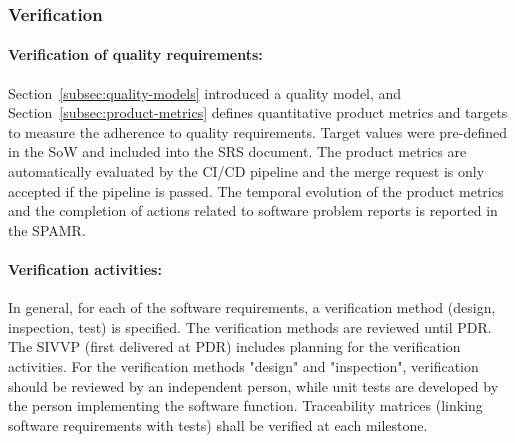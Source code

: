 \subsubsection{Verification}
\label{subsec:verification}

%
%
%
%
%
%

\paragraph*{Verification of quality requirements:} Section~\ref{subsec:quality-models} introduced a quality model, and Section~\ref{subsec:product-metrics} defines quantitative product metrics and targets to measure the adherence to quality requirements. Target values were pre-defined in the SoW and included into the SRS document. The product metrics are automatically evaluated by the CI/CD pipeline and the merge request is only accepted if the pipeline is passed. The temporal evolution of the product metrics and the completion of actions related to software problem reports is reported in the SPAMR.

\paragraph*{Verification activities:} In general, for each of the software requirements, a verification method (design, inspection, test) is specified. The verification methods are reviewed until PDR. The SIVVP (first delivered at PDR) includes planning for the verification activities. For the verification methods "design" and "inspection", verification should be reviewed by an independent person, while unit tests are developed by the person implementing the software function. Traceability matrices (linking software requirements with tests) shall be verified at each milestone.

